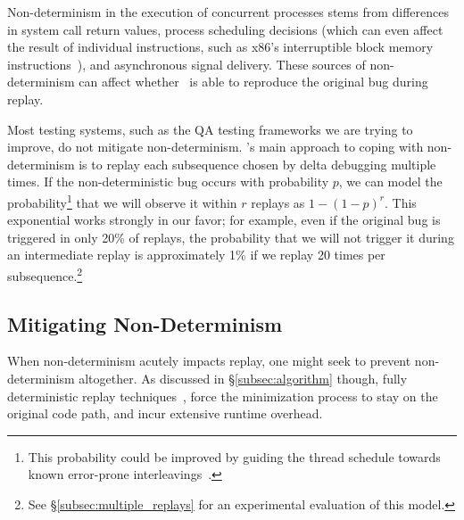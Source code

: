 Non-determinism in the execution of concurrent processes stems from
differences in system call return values, process scheduling decisions (which can
even affect the result of individual instructions, such as x86's
interruptible block memory instructions~\cite{Dunlap:2002:REI:844128.844148}),
and asynchronous signal
delivery. These sources of non-determinism can affect whether \projectname~is
able to reproduce the original bug during replay.

Most testing systems, such as the QA testing frameworks we are
trying to improve, do not mitigate non-determinism.
\projectname's main approach to coping with non-determinism
is to replay each subsequence chosen
by delta debugging multiple times. If the non-deterministic bug occurs with
probability $p$, we can model the probability\footnote{This probability could be improved by guiding the thread schedule
towards known error-prone interleavings~\cite{park2009ctrigger,park2009pres}.}
that we will observe it within $r$ replays as $1-(1-p)^{r}$. This exponential
works strongly in our favor; for example, even if the original bug is
triggered in only 20\% of replays, the probability that we will not trigger
it during an intermediate replay is approximately
1\% if we replay 20 times per subsequence.\footnote{See
\S\ref{subsec:multiple_replays} for an experimental evaluation of this model.}

\subsection{Mitigating Non-Determinism}
\label{subsec:mitigating}

When non-determinism acutely impacts replay, one might seek to prevent non-determinism altogether.
As discussed in \S\ref{subsec:algorithm} though, fully deterministic replay techniques~\cite{Dunlap:2002:REI:844128.844148,Geels:2006:RDD:1267359.1267386},
force the minimization process to stay on the original code path, and incur
extensive runtime overhead.

